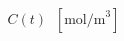 \documentclass[preview]{standalone}
\begin{document}
\begin{align*}
C(t) \;\; [\text{mol/m}^3]
\end{align*}
\end{document}
